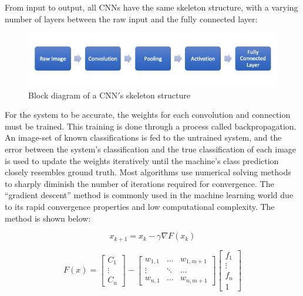\documentclass[12pt]{drexelthesis}
\begin{document}
From input to output, all CNNs have the same skeleton structure, with a varying number of layers between the raw input and the fully connected layer:

\begin{figure}[!h]
\centering
\includegraphics[width=6in]{cnn_flow.png}
\caption[Block diagram of CNN flow]{\centering Block diagram of a CNN$'$s skeleton structure}
\end{figure}

For the system to be accurate, the weights for each convolution and connection must be trained. This training is done through a process called backpropagation. An image-set of known classifications is fed to the untrained system, and the error between the system’s classification and the true classification of each image is used to update the weights iteratively until the machine’s class prediction closely resembles ground truth. Most algorithms use numerical solving methods to sharply diminish the number of iterations required for convergence. The “gradient descent” method is commonly used in the machine learning world due to its rapid convergence properties and low computational complexity. The method is shown below:

\begin{equation}
	x_{k+1} = x_{k} - \gamma \nabla F(x_{k})
\end{equation}

\begin{equation}
 F(x) =
\begin{bmatrix}
C_{1} \\
\vdots \\
C_{n}
\end{bmatrix}  -  \begin{bmatrix} w_{1,1} & \hdots & w_{1,m+1} \\ \vdots & \ddots & \hdots \\ w_{n,1} & \hdots & w_{n, m+1} \end{bmatrix}  \begin{bmatrix} f_{1} \\ \vdots \\ f_{n} \\ 1 \end{bmatrix} 
\end{equation}
\end{document}
